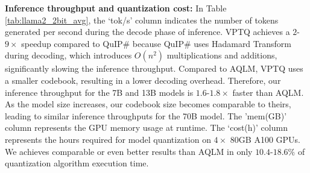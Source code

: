 \textbf{Inference throughput and quantization cost:}
In Table \ref{tab:llama2_2bit_avg}, the `tok/s' column indicates the number of tokens generated per second during the decode phase of inference. VPTQ achieves a $2$-$9\times$ speedup compared to QuIP\# because QuIP\# uses Hadamard Transform during decoding, which introduces $O(n^2)$ multiplications and additions, significantly slowing the inference throughput. Compared to AQLM, VPTQ uses a smaller codebook, resulting in a lower decoding overhead. Therefore, our inference throughput for the 7B and 13B models is $1.6$-$1.8\times$ faster than AQLM. As the model size increases, our codebook size becomes comparable to theirs, leading to similar inference throughputs for the 70B model. The 'mem(GB)' column represents the GPU memory usage at runtime.
The `cost(h)' column represents the hours required for model quantization on $4\times$ 80GB A100 GPUs. We achieves comparable or even better results than AQLM in only $10.4$-$18.6\%$ of quantization algorithm execution time.















 
